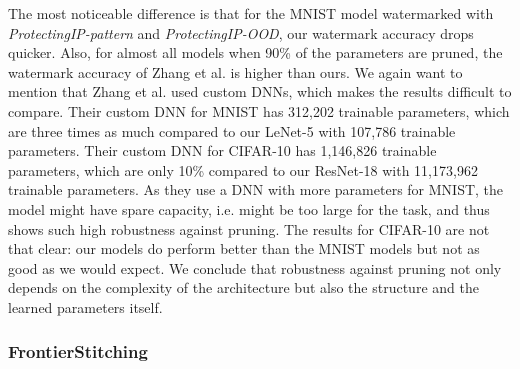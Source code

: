 The most noticeable difference is that for the MNIST model watermarked with \textit{ProtectingIP-pattern} and \textit{ProtectingIP-OOD}, our watermark accuracy drops quicker. Also, for almost all models when 90\% of the parameters are pruned, the watermark accuracy of Zhang et al. is higher than ours. We again want to mention that Zhang et al. \cite{zhang_protecting_2018} used custom DNNs, which makes the results difficult to compare. Their custom DNN for MNIST has 312,202 trainable parameters, which are three times as much compared to our LeNet-5 with 107,786 trainable parameters. Their custom DNN for CIFAR-10 has 1,146,826 trainable parameters, which are only 10\% compared to our ResNet-18 with 11,173,962 trainable parameters. As they use a DNN with more parameters for MNIST, the model might have spare capacity, i.e. might be too large for the task, and thus shows such high robustness against pruning. The results for CIFAR-10 are not that clear: our models do perform better than the MNIST models but not as good as we would expect. We conclude that robustness against pruning not only depends on the complexity of the architecture but also the structure and the learned parameters itself.





\subsubsection{FrontierStitching} \label{sec:compare-results:frontier}

